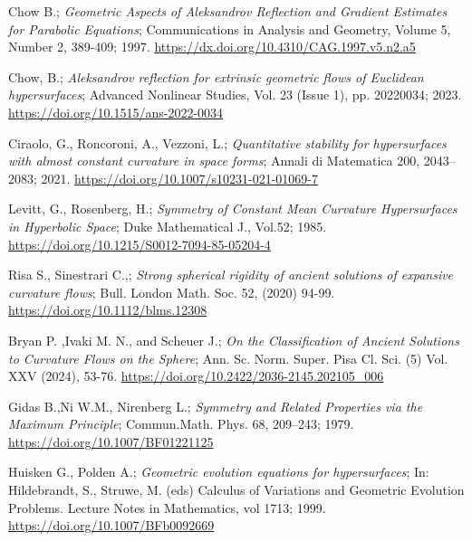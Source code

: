 \documentclass[a4paper, 12pt]{book}
\begin{document}
{}
\begin{thebibliography}{11} 
	 Chow B.; {\em Geometric Aspects of Aleksandrov Reflection and Gradient Estimates for Parabolic Equations}; Communications in Analysis and Geometry, Volume 5, Number 2, 389-409; 1997. \href{https://dx.doi.org/10.4310/CAG.1997.v5.n2.a5}{https://dx.doi.org/10.4310/CAG.1997.v5.n2.a5}
	
	 Chow, B.; {\em Aleksandrov reflection for extrinsic geometric flows of Euclidean hypersurfaces}; Advanced Nonlinear Studies, Vol. 23 (Issue 1), pp. 20220034; 2023. \href{https://doi.org/10.1515/ans-2022-0034}{https://doi.org/10.1515/ans-2022-0034}
	
	 Ciraolo, G., Roncoroni, A., Vezzoni, L.;  {\em Quantitative stability for hypersurfaces with almost constant curvature in space forms}; Annali di Matematica 200, 2043–2083; 2021. \href{https://doi.org/10.1007/s10231-021-01069-7}{https://doi.org/10.1007/s10231-021-01069-7}
	
	 Levitt, G., Rosenberg, H.;  {\em Symmetry of Constant Mean Curvature Hypersurfaces in Hyperbolic Space}; Duke Mathematical J., Vol.52; 1985. \href{https://doi.org/10.1215/S0012-7094-85-05204-4}{https://doi.org/10.1215/S0012-7094-85-05204-4}
	
	  Risa S., Sinestrari C.,; {\em Strong spherical rigidity of ancient solutions of expansive curvature flows};  Bull. London Math. Soc. 52, (2020) 94-99. \href{https://doi.org/10.1112/blms.12308}{https://doi.org/10.1112/blms.12308}
	
	Bryan P. ,Ivaki M. N., and Scheuer J.; {\em On the Classification of Ancient Solutions to Curvature Flows on the Sphere}; Ann. Sc. Norm. Super. Pisa Cl. Sci. (5)
	Vol. XXV (2024), 53-76. \href{https://doi.org/10.2422/2036-2145.202105_006}{https://doi.org/10.2422/2036-2145.202105\_006} 
	
	 Gidas B.,Ni W.M., Nirenberg L.; {\em Symmetry and Related Properties via the Maximum Principle};  Commun.Math. Phys. 68, 209–243; 1979. \href{ https://doi.org/10.1007/BF01221125}{ https://doi.org/10.1007/BF01221125}
	
	 Huisken G., Polden A.; {\em Geometric evolution equations for hypersurfaces};  In: Hildebrandt, S., Struwe, M. (eds) Calculus of Variations and Geometric Evolution Problems. Lecture Notes in Mathematics, vol 1713; 1999. \href{https://doi.org/10.1007/BFb0092669}{https://doi.org/10.1007/BFb0092669}
	

\end{thebibliography}
\end{document}
